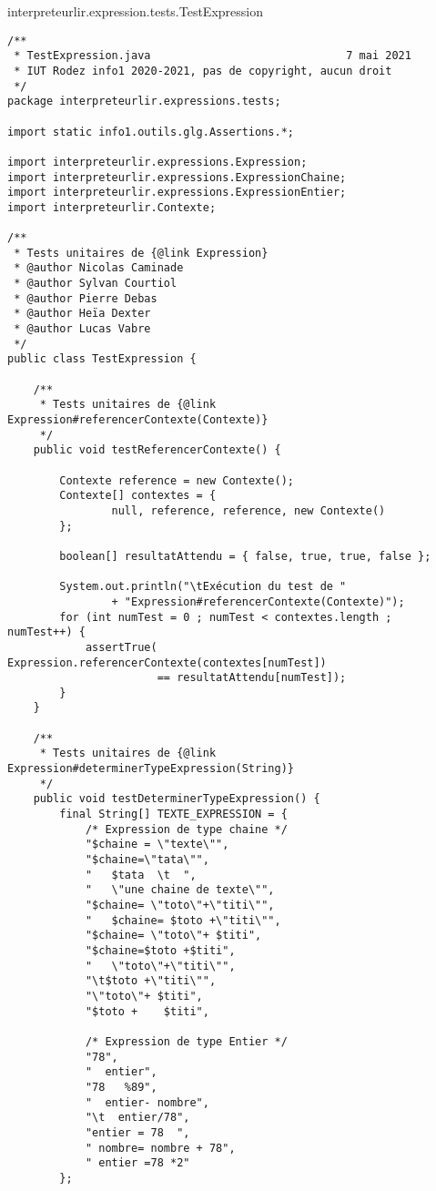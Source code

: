 \begin{enum}
    \item interpreteurlir.expression.tests.TestExpression
\begin{verbatim}
/**
 * TestExpression.java                              7 mai 2021
 * IUT Rodez info1 2020-2021, pas de copyright, aucun droit
 */
package interpreteurlir.expressions.tests;

import static info1.outils.glg.Assertions.*;

import interpreteurlir.expressions.Expression;
import interpreteurlir.expressions.ExpressionChaine;
import interpreteurlir.expressions.ExpressionEntier;
import interpreteurlir.Contexte;

/**
 * Tests unitaires de {@link Expression}
 * @author Nicolas Caminade
 * @author Sylvan Courtiol
 * @author Pierre Debas
 * @author Heïa Dexter
 * @author Lucas Vabre
 */
public class TestExpression {
    
    /**
     * Tests unitaires de {@link Expression#referencerContexte(Contexte)}
     */
    public void testReferencerContexte() {

        Contexte reference = new Contexte();
        Contexte[] contextes = {
                null, reference, reference, new Contexte()
        };
        
        boolean[] resultatAttendu = { false, true, true, false };
        
        System.out.println("\tExécution du test de "
                + "Expression#referencerContexte(Contexte)");
        for (int numTest = 0 ; numTest < contextes.length ;  numTest++) {
            assertTrue(   Expression.referencerContexte(contextes[numTest]) 
                       == resultatAttendu[numTest]);
        }
    }
    
    /**
     * Tests unitaires de {@link Expression#determinerTypeExpression(String)}
     */
    public void testDeterminerTypeExpression() {
        final String[] TEXTE_EXPRESSION = {
            /* Expression de type chaine */
            "$chaine = \"texte\"",  
            "$chaine=\"tata\"",
            "   $tata  \t  ",
            "   \"une chaine de texte\"",
            "$chaine= \"toto\"+\"titi\"",
            "   $chaine= $toto +\"titi\"",
            "$chaine= \"toto\"+ $titi",
            "$chaine=$toto +$titi",
            "   \"toto\"+\"titi\"",
            "\t$toto +\"titi\"",
            "\"toto\"+ $titi",
            "$toto +    $titi", 
            
            /* Expression de type Entier */
            "78",
            "  entier",
            "78   %89",
            "  entier- nombre",
            "\t  entier/78",
            "entier = 78  ",
            " nombre= nombre + 78",
            " entier =78 *2"
        };
        

\end{verbatim}
\end{enum}
